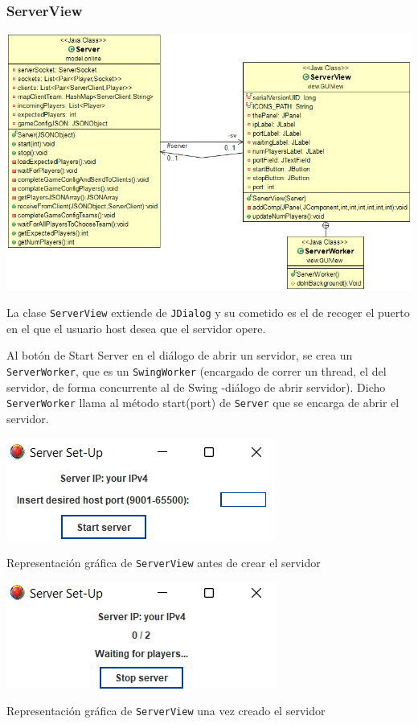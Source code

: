 \documentclass[../DocumentoOficial.tex]{subfiles}
\begin{document}
\subsubsection{ServerView}
\begin{center}
\includegraphics[scale=0.55]{serverviewuml.png}
\end{center}

La clase \texttt{ServerView} extiende de \texttt{JDialog} y su cometido es el de recoger el puerto en el que el usuario host desea que el servidor opere.

Al botón de Start Server en el diálogo de abrir un servidor, se crea un \texttt{ServerWorker}, que es un \texttt{SwingWorker} (encargado de correr un thread, el del servidor, de forma concurrente al de Swing -diálogo de abrir servidor). Dicho \texttt{ServerWorker} llama al método start(port) de \texttt{Server} que se encarga de abrir el servidor.

\begin{center}
\includegraphics[scale=1]{serversetup.png}

Representación gráfica de \texttt{ServerView} antes de crear el servidor

\end{center}

\begin{center}
\includegraphics[scale=1]{waitingserver.png}

Representación gráfica de \texttt{ServerView} una vez creado el servidor
\end{center}
\end{document}
